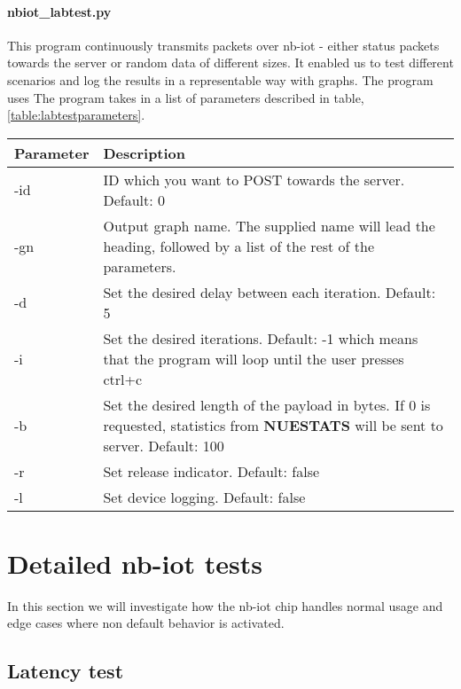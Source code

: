\documentclass[USenglish]{ifimaster}  %
\begin{document}
\paragraph{\textbf{nbiot\_labtest.py}}
This program continuously transmits packets over \acrshort{nb-iot} - either status packets towards the server or random data of different sizes. It enabled us to test different scenarios and log the results in a representable way with graphs. The program uses The program takes in a list of parameters described in table, \vref{table:labtestparameters}.

\begin{center} \label{table:labtestparameters}
  \begin{tabular}{ | l | m{10cm} | }
    \hline
    Parameter & Description \\
    \hline
    -id & ID which you want to POST towards the server. Default: 0 \\
    \hline
    -gn & Output graph name. The supplied name will lead the heading, followed by a list of the rest of the parameters. \\
    \hline
    -d & Set the desired delay between each iteration. Default: 5 \\
    \hline
    -i & Set the desired iterations. Default: -1 which means that the program will loop until the user presses ctrl+c \\
    \hline
    -b & Set the desired length of the payload in bytes. If 0 is requested, statistics from \textbf{NUESTATS} will be sent to server. Default: 100 \\
    \hline
    -r & Set release indicator. Default: false \\
    \hline
    -l & Set device logging. Default: false \\
    \hline
  \end{tabular}
\end{center}

\section{Detailed \acrshort{nb-iot} tests} \label{section:detailedtest}
In this section we will investigate how the \acrshort{nb-iot} chip handles normal usage and edge cases where non default behavior is activated.

\subsection{Latency test} \label{ssection:latencytest}
\end{document}

